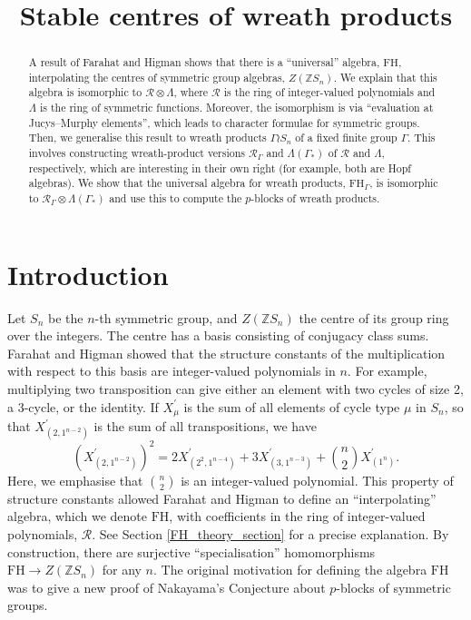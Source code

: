 \documentclass[ALCO,Unicode]{cedram}
\title{Stable centres of wreath products}
\author[\initial{C.} Ryba]{\firstname{Christopher} \lastname{Ryba}}
\newcommand{\RGamma}{\mathcal{R}_{\Gamma}}
\newcommand{\LambdaG}{\Lambda(\Gamma_*)}
\newcommand{\FH}{\mathrm{FH}}
\newcommand{\FHG}{\mathrm{FH}_{\Gamma}}
\newcommand{\FH}{\mathrm{FH}}
\newcommand{\RGamma}{\mathcal{R}_{\Gamma}}
\newcommand{\LambdaG}{\Lambda(\Gamma_*)}
\newcommand{\FHG}{\mathrm{FH}_{\Gamma}}
\begin{document}
\begin{abstract}
A result of Farahat and Higman shows that there is a ``universal'' algebra, $\FH$, interpolating the centres of symmetric group algebras, $Z(\mathbb{Z}S_n)$. We explain that this algebra is isomorphic to $\mathcal{R} \otimes \Lambda$, where $\mathcal{R}$ is the ring of integer-valued polynomials and $\Lambda$ is the  ring of symmetric functions. Moreover, the isomorphism is via ``evaluation at Jucys--Murphy elements'', which leads to character formulae for symmetric groups. Then, we generalise this result to wreath products $\Gamma \wr S_n$ of a fixed finite group $\Gamma$. This involves constructing wreath-product versions $\RGamma$ and $\LambdaG$ of $\mathcal{R}$ and $\Lambda$, respectively, which are interesting in their own right (for example, both are Hopf algebras). We show that the universal algebra for wreath products, $\FHG$, is isomorphic to $\RGamma \otimes \LambdaG$ and use this to compute the $p$-blocks of wreath products.
\end{abstract}

\maketitle


\section{Introduction}
Let $S_n$ be the $n$-th symmetric group, and $Z(\mathbb{Z}S_n)$ the centre of its group ring over the integers. The centre has a basis consisting of conjugacy class sums. Farahat and Higman \cite{FarahatHigman} showed that the structure constants of the multiplication with respect to this basis are integer-valued polynomials in $n$. For example, multiplying two transposition can give either an element with two cycles of size 2, a 3-cycle, or the identity. If $X_\mu^\prime$ is the sum of all elements of cycle type $\mu$ in $S_n$, so that $X_{(2,1^{n-2})}^\prime$ is the sum of all transpositions, we have
\begin{equation}
(X_{(2,1^{n-2})}^\prime)^2 = 2X_{(2^2,1^{n-4})}^\prime + 3X_{(3,1^{n-3})}^\prime + \binom{n}{2}X_{(1^{n})}^\prime.
\end{equation}
Here, we emphasise that $\binom{n}{2}$ is an integer-valued polynomial. This property of structure constants allowed Farahat and Higman to define an ``interpolating'' algebra, which we denote $\FH$, with coefficients in the ring of integer-valued polynomials, $\mathcal{R}$. See Section \ref{FH_theory_section} for a precise explanation. By construction, there are surjective ``specialisation'' homomorphisms $\FH \to Z(\mathbb{Z}S_n)$ for any $n$. The original motivation for defining the algebra $\FH$ was to give a new proof of Nakayama's Conjecture about $p$-blocks of symmetric groups.
\end{document}
